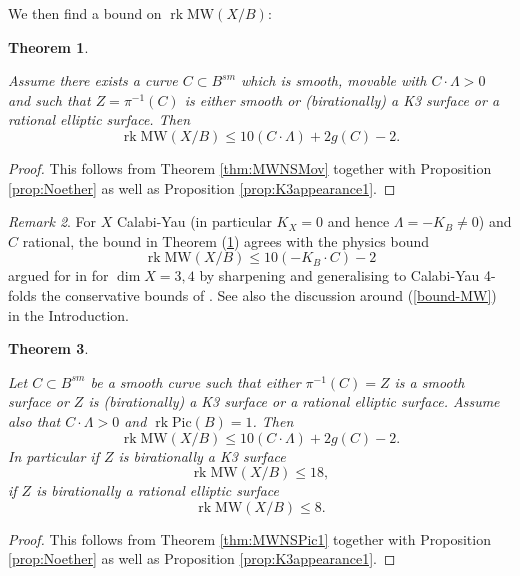 \documentclass[11pt]{amsart}
\newtheorem{theorem}{Theorem}[section]
\theoremstyle{definition}
\theoremstyle{definition}
\theoremstyle{remark}
\newtheorem{remark}[theorem]{Remark}
\theoremstyle{remark}
\theoremstyle{definition}
\theoremstyle{conjecture}
\newcommand{\MW}{\mathrm{MW}}
\newcommand{\Pic}{\mathrm{Pic}}
\begin{document}
We then find a bound on $\operatorname{rk} \MW(X/B)$:  
 
\begin{theorem}\label{thm:BoundsFromNoetherMov}  
 
Assume there exists a curve $C \subset B^{sm}$ which is smooth, movable with $C \cdot \Lambda > 0$  and such that   $Z = \pi^{-1}(C)$ is  either  smooth or (birationally) a K3 surface  or a rational elliptic surface\color{black}. 
Then
	\[
	\operatorname{rk} \MW(X/B) \leq 10 (C  \cdot \Lambda) +2 g(C) -2.
	\]
	
\end{theorem}
\begin{proof}
This follows from Theorem \ref{thm:MWNSMov} %
together with Proposition \ref{prop:Noether} as well as Proposition \ref{prop:K3appearance1}.
\end{proof}

\begin{remark}
For $X$ Calabi-Yau (in particular $K_X = 0$ and hence $\Lambda = -K_B \neq 0$) and $C$ rational, the bound in Theorem (\ref{thm:BoundsFromNoetherMov}) agrees with the physics bound 
\begin{equation}\label{boundX-2}
	\operatorname{rk} \MW(X/B) \leq 10 ( -K_B \cdot C)  -2
	\end{equation}
    argued for in \cite{Martucci:2022krl} for $\dim X =3,4$ by sharpening and generalising to Calabi-Yau 4-folds the conservative bounds of \cite{Lee:2019skh}.
 See also the discussion around (\ref{bound-MW}) in the Introduction.
\end{remark}



\begin{theorem}\label{thm:BoundsFromNoetherPic1}  

Let  $C \subset B^{sm}$  be a smooth 
curve such that either  $\pi^{-1}(C)=Z$ is a smooth surface or $Z$ is (birationally) a K3 surface  or a rational elliptic surface\color{black}.
 Assume also that $C \cdot \Lambda  > 0$ and $\operatorname{rk} \Pic (B)=1$.   Then
	\[
	\operatorname{rk} \MW(X/B) \leq 10 (C  \cdot \Lambda) +2 g(C) -2.
	\]
In particular if $Z$ is birationally a K3 surface 	
\[
	\operatorname{rk} \MW(X/B) \leq 18,\]
    if $Z$ is birationally a rational elliptic surface
   \[
	\operatorname{rk} \MW(X/B) \leq 8.\] 
    \color{black}
\end{theorem}

\begin{proof}
This follows from Theorem %
\ref{thm:MWNSPic1}
together with Proposition \ref{prop:Noether} as well as Proposition \ref{prop:K3appearance1}.
\end{proof}
\end{document}

